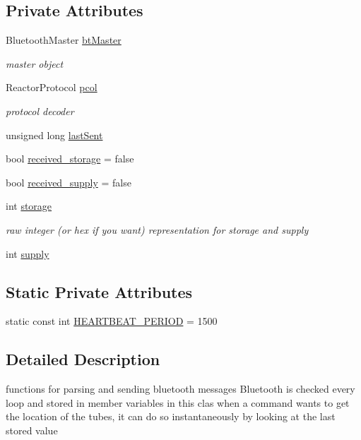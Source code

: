 \subsection*{Private Attributes}
\begin{DoxyCompactItemize}
\item 
Bluetooth\-Master \hyperlink{classBTClient_a5376be2a850c64faab1e9a02adcd342b}{bt\-Master}
\begin{DoxyCompactList}\small\item\em master object \end{DoxyCompactList}\item 
Reactor\-Protocol \hyperlink{classBTClient_a64bd4b5e464d0b6a57957428ef559142}{pcol}
\begin{DoxyCompactList}\small\item\em protocol decoder \end{DoxyCompactList}\item 
unsigned long \hyperlink{classBTClient_a946cc60b431ec813642b97b0c4b76cf3}{last\-Sent}
\item 
bool \hyperlink{classBTClient_a41a7d3382ab8bbdf4b7d78b7b69ff85f}{received\-\_\-storage} = false
\item 
bool \hyperlink{classBTClient_af00b18b695ecc4bdeea133572eb0fd6d}{received\-\_\-supply} = false
\item 
int \hyperlink{classBTClient_a5ba419e7e6be73f5ec26f6b6c8d4ccf1}{storage}
\begin{DoxyCompactList}\small\item\em raw integer (or hex if you want) representation for storage and supply \end{DoxyCompactList}\item 
int \hyperlink{classBTClient_a3974a28859432eeef27cfd7391ed7d60}{supply}
\end{DoxyCompactItemize}
\subsection*{Static Private Attributes}
\begin{DoxyCompactItemize}
\item 
static const int \hyperlink{classBTClient_a9467446e5173d60a224c22f07dbba8de}{H\-E\-A\-R\-T\-B\-E\-A\-T\-\_\-\-P\-E\-R\-I\-O\-D} = 1500
\end{DoxyCompactItemize}


\subsection{Detailed Description}
functions for parsing and sending bluetooth messages Bluetooth is checked every loop and stored in member variables in this clas when a command wants to get the location of the tubes, it can do so instantaneously by looking at the last stored value 

